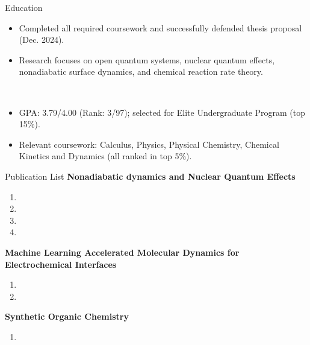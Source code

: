 \documentclass{resume}
\begin{document}
\begin{rSection}{Education}
     \\
    \begin{itemize}[noitemsep, nosep]
        \item Completed all required coursework and successfully defended thesis proposal (Dec. 2024).
        \item Research focuses on open quantum systems, nuclear quantum effects, nonadiabatic surface dynamics, and chemical reaction rate theory.
    \end{itemize}

     \\
    \begin{itemize}[noitemsep, nosep]
        \item GPA: 3.79/4.00 (Rank: 3/97); selected for Elite Undergraduate Program (top 15\%).
        \item Relevant coursework: Calculus, Physics, Physical Chemistry, Chemical Kinetics and Dynamics (all ranked in top 5\%).
    \end{itemize}
\end{rSection}

\begin{rSection}{Publication List}
    \textbf{Nonadiabatic dynamics and Nuclear Quantum Effects}
    \begin{enumerate}
        \item {} 
        \item {} 
        \item {} 
        \item {} 
    \end{enumerate}

    \textbf{Machine Learning Accelerated Molecular Dynamics for Electrochemical Interfaces}
    \begin{enumerate}
        \item {} 
        \item {} 
    \end{enumerate}
    \textbf{Synthetic Organic Chemistry}    
    \begin{enumerate}
        \item {} 
    \end{enumerate}
\end{rSection}
\end{document}

